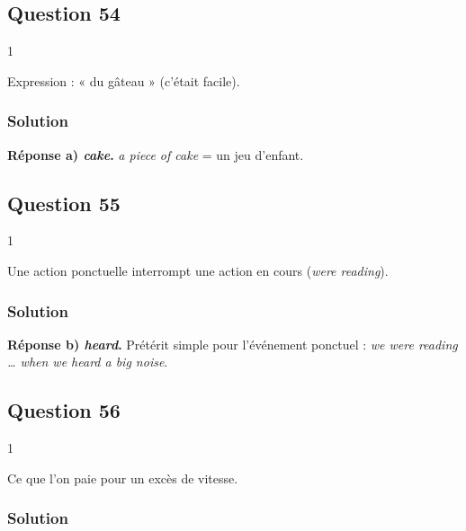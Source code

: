 \documentclass[11pt,a4paper]{article}
\begin{document}
\hypertarget{question-54}{%
\subsection{Question 54}\label{question-54}}

\begin{indication}{1}

Expression : « du gâteau » (c'était facile).

\end{indication}

\hypertarget{solution-53}{%
\subsubsection{Solution}\label{solution-53}}

\textbf{Réponse a) \emph{cake}.} \emph{a piece of cake} = un jeu d'enfant.

\hypertarget{question-55}{%
\subsection{Question 55}\label{question-55}}

\begin{indication}{1}

Une action ponctuelle interrompt une action en cours (\emph{were reading}).

\end{indication}

\hypertarget{solution-54}{%
\subsubsection{Solution}\label{solution-54}}

\textbf{Réponse b) \emph{heard}.} Prétérit simple pour l'événement ponctuel : \emph{we were reading \ldots{} when we heard a big noise}.

\hypertarget{question-56}{%
\subsection{Question 56}\label{question-56}}

\begin{indication}{1}

Ce que l'on paie pour un excès de vitesse.

\end{indication}

\hypertarget{solution-55}{%
\subsubsection{Solution}\label{solution-55}}
\end{document}

